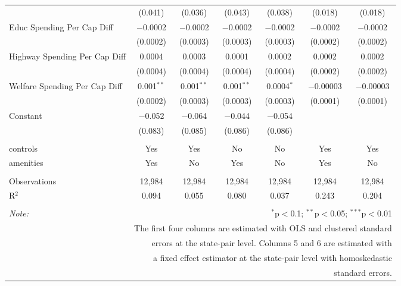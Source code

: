 \begin{table}[!htbp]
\begin{tabular}{@{\extracolsep{5pt}}lcccccc}
  & (0.041) & (0.036) & (0.043) & (0.038) & (0.018) & (0.018) \\ 
  Educ Spending Per Cap Diff & $-$0.0002 & $-$0.0002 & $-$0.0002 & $-$0.0002 & $-$0.0002 & $-$0.0002 \\ 
  & (0.0002) & (0.0003) & (0.0003) & (0.0003) & (0.0002) & (0.0002) \\ 
  Highway Spending Per Cap Diff & 0.0004 & 0.0003 & 0.0001 & 0.0002 & 0.0002 & 0.0002 \\ 
  & (0.0004) & (0.0004) & (0.0004) & (0.0004) & (0.0002) & (0.0002) \\ 
  Welfare Spending Per Cap Diff & 0.001$^{**}$ & 0.001$^{**}$ & 0.001$^{**}$ & 0.0004$^{*}$ & $-$0.00003 & $-$0.00003 \\ 
  & (0.0002) & (0.0003) & (0.0003) & (0.0003) & (0.0001) & (0.0001) \\ 
  Constant & $-$0.052 & $-$0.064 & $-$0.044 & $-$0.054 &  &  \\ 
  & (0.083) & (0.085) & (0.086) & (0.086) &  &  \\ 
 \hline \\[-1.8ex] 
controls & Yes & Yes & No & No & Yes & Yes \\ 
amenities & Yes & No & Yes & No & Yes & No \\ 
\hline \\[-1.8ex] 
Observations & 12,984 & 12,984 & 12,984 & 12,984 & 12,984 & 12,984 \\ 
R$^{2}$ & 0.094 & 0.055 & 0.080 & 0.037 & 0.243 & 0.204 \\ 
\hline 
\hline \\[-1.8ex] 
\textit{Note:}  & \multicolumn{6}{r}{$^{*}$p$<$0.1; $^{**}$p$<$0.05; $^{***}$p$<$0.01} \\ 
 & \multicolumn{6}{r}{The first four columns are estimated with OLS and clustered standard} \\ 
 & \multicolumn{6}{r}{ errors at the state-pair level. Columns 5 and 6 are estimated with} \\ 
 & \multicolumn{6}{r}{a fixed effect estimator at the state-pair level with homoskedastic} \\ 
 & \multicolumn{6}{r}{standard errors.} \\ 
\end{tabular} 
\end{table} 
